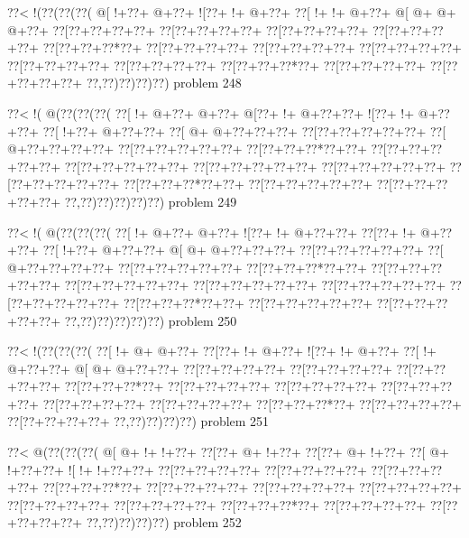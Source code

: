 \vbox{\vbox{\goo
\0??<\- !(\0??(\0??(\0??(
\- @[\- !+\0??+\- @+\0??+
\- ![\0??+\- !+\- @+\0??+
\0??[\- !+\- !+\- @+\0??+
\- @[\- @+\- @+\- @+\0??+
\0??[\0??+\0??+\0??+\0??+
\0??[\0??+\0??+\0??+\0??+
\0??[\0??+\0??+\0??+\0??+
\0??[\0??+\0??+\0??+\0??+
\0??[\0??+\0??+\0??*\0??+
\0??[\0??+\0??+\0??+\0??+
\0??[\0??+\0??+\0??+\0??+
\0??[\0??+\0??+\0??+\0??+
\0??[\0??+\0??+\0??+\0??+
\0??[\0??+\0??+\0??+\0??+
\0??[\0??+\0??+\0??*\0??+
\0??[\0??+\0??+\0??+\0??+
\0??[\0??+\0??+\0??+\0??+
\0??,\0??)\0??)\0??)\0??)
}
\hfil problem 248\hfil\break
}

\vbox{\vbox{\goo
\0??<\- !(\- @(\0??(\0??(\0??(
\0??[\- !+\- @+\0??+\- @+\0??+
\- @[\0??+\- !+\- @+\0??+\0??+
\- ![\0??+\- !+\- @+\0??+\0??+
\0??[\- !+\0??+\- @+\0??+\0??+
\0??[\- @+\- @+\0??+\0??+\0??+
\0??[\0??+\0??+\0??+\0??+\0??+
\0??[\- @+\0??+\0??+\0??+\0??+
\0??[\0??+\0??+\0??+\0??+\0??+
\0??[\0??+\0??+\0??*\0??+\0??+
\0??[\0??+\0??+\0??+\0??+\0??+
\0??[\0??+\0??+\0??+\0??+\0??+
\0??[\0??+\0??+\0??+\0??+\0??+
\0??[\0??+\0??+\0??+\0??+\0??+
\0??[\0??+\0??+\0??+\0??+\0??+
\0??[\0??+\0??+\0??*\0??+\0??+
\0??[\0??+\0??+\0??+\0??+\0??+
\0??[\0??+\0??+\0??+\0??+\0??+
\0??,\0??)\0??)\0??)\0??)\0??)
}
\hfil problem 249\hfil\break
}

\vbox{\vbox{\goo
\0??<\- !(\- @(\0??(\0??(\0??(
\0??[\- !+\- @+\0??+\- @+\0??+
\- ![\0??+\- !+\- @+\0??+\0??+
\0??[\0??+\- !+\- @+\0??+\0??+
\0??[\- !+\0??+\- @+\0??+\0??+
\- @[\- @+\- @+\0??+\0??+\0??+
\0??[\0??+\0??+\0??+\0??+\0??+
\0??[\- @+\0??+\0??+\0??+\0??+
\0??[\0??+\0??+\0??+\0??+\0??+
\0??[\0??+\0??+\0??*\0??+\0??+
\0??[\0??+\0??+\0??+\0??+\0??+
\0??[\0??+\0??+\0??+\0??+\0??+
\0??[\0??+\0??+\0??+\0??+\0??+
\0??[\0??+\0??+\0??+\0??+\0??+
\0??[\0??+\0??+\0??+\0??+\0??+
\0??[\0??+\0??+\0??*\0??+\0??+
\0??[\0??+\0??+\0??+\0??+\0??+
\0??[\0??+\0??+\0??+\0??+\0??+
\0??,\0??)\0??)\0??)\0??)\0??)
}
\hfil problem 250\hfil\break
}

\vbox{\vbox{\goo
\0??<\- !(\0??(\0??(\0??(
\0??[\- !+\- @+\- @+\0??+
\0??[\0??+\- !+\- @+\0??+
\- ![\0??+\- !+\- @+\0??+
\0??[\- !+\- @+\0??+\0??+
\- @[\- @+\- @+\0??+\0??+
\0??[\0??+\0??+\0??+\0??+
\0??[\0??+\0??+\0??+\0??+
\0??[\0??+\0??+\0??+\0??+
\0??[\0??+\0??+\0??*\0??+
\0??[\0??+\0??+\0??+\0??+
\0??[\0??+\0??+\0??+\0??+
\0??[\0??+\0??+\0??+\0??+
\0??[\0??+\0??+\0??+\0??+
\0??[\0??+\0??+\0??+\0??+
\0??[\0??+\0??+\0??*\0??+
\0??[\0??+\0??+\0??+\0??+
\0??[\0??+\0??+\0??+\0??+
\0??,\0??)\0??)\0??)\0??)
}
\hfil problem 251\hfil\break
}

\vbox{\vbox{\goo
\0??<\- @(\0??(\0??(\0??(
\- @[\- @+\- !+\- !+\0??+
\0??[\0??+\- @+\- !+\0??+
\0??[\0??+\- @+\- !+\0??+
\0??[\- @+\- !+\0??+\0??+
\- ![\- !+\- !+\0??+\0??+
\0??[\0??+\0??+\0??+\0??+
\0??[\0??+\0??+\0??+\0??+
\0??[\0??+\0??+\0??+\0??+
\0??[\0??+\0??+\0??*\0??+
\0??[\0??+\0??+\0??+\0??+
\0??[\0??+\0??+\0??+\0??+
\0??[\0??+\0??+\0??+\0??+
\0??[\0??+\0??+\0??+\0??+
\0??[\0??+\0??+\0??+\0??+
\0??[\0??+\0??+\0??*\0??+
\0??[\0??+\0??+\0??+\0??+
\0??[\0??+\0??+\0??+\0??+
\0??,\0??)\0??)\0??)\0??)
}
\hfil problem 252\hfil\break
}

